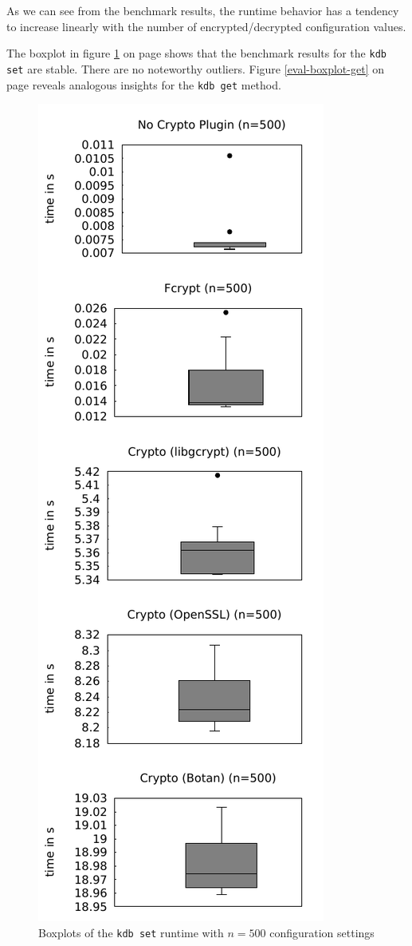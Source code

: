 As we can see from the benchmark results, the runtime behavior has a tendency to increase linearly with the number of encrypted/decrypted configuration values.

The boxplot in figure \ref{eval-boxplot-set} on page \pageref{eval-boxplot-set} shows that the benchmark results for the \texttt{kdb set} are stable.
There are no noteworthy outliers.
Figure \ref{eval-boxplot-get} on page \pageref{eval-boxplot-get} reveals analogous insights for the \texttt{kdb get} method.

\begin{figure}[h]
\center
\caption{Boxplots of the \texttt{kdb set} runtime with $n = 500$ configuration settings}
\label{eval-boxplot-set}
\includegraphics{plots/boxplot_500_set.pdf}
\end{figure}

